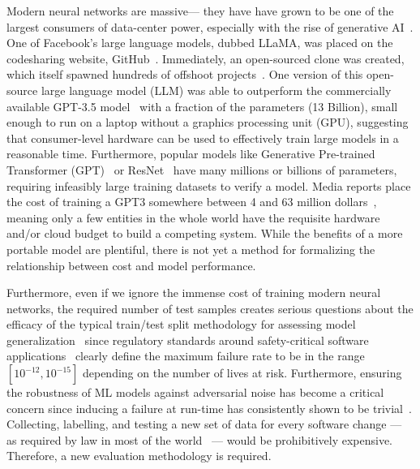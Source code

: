 \documentclass[conference]{IEEEtran}
\begin{document}
Modern neural networks are massive--- they have have grown to be one of the largest consumers of data-center power, especially with the rise of generative AI~\cite{msft_water}.
One of Facebook's large language models, dubbed LLaMA, was placed on the codesharing website, GitHub~\cite{llama}. Immediately, an open-sourced clone was created, which itself spawned hundreds of offshoot projects~\cite{openllama}. One version of this open-source large language model (LLM) was able to outperform the commercially available GPT-3.5 model~\cite{liu2023goat} with a fraction of the parameters (13 Billion), small enough to run on a laptop without a graphics processing unit (GPU), suggesting that consumer-level hardware can be used to effectively train large models in a reasonable time. Furthermore, popular models like Generative Pre-trained Transformer (GPT)~\cite{floridi2020gpt} or ResNet~\cite{resnet} have many millions or billions of parameters, requiring infeasibly large training datasets to verify a model\cite{vcdimension}. Media reports place the cost of training a GPT3 somewhere between 4 and 63 million dollars~\cite{Patel_Ahmad_2023,Feswing_2023}, meaning only a few entities in the whole world have the requisite hardware and/or cloud budget to build a competing system. While the benefits of a more portable model are plentiful, there is not yet a method for formalizing the relationship between cost and model performance.

Furthermore, even if we ignore the immense cost of training modern neural networks, the required number of test samples creates serious questions about the efficacy of the typical train/test split methodology for assessing model generalization~\cite{meyers} since regulatory standards around safety-critical software applications~\cite{IEC61508,iso26262,aviation_software,safetyframework} clearly define the maximum failure rate to be in the range $[10^{-12}, 10^{-15}]$ depending on the number of lives at risk. Furthermore, ensuring the robustness of ML models against adversarial noise has become a critical concern since inducing a failure at run-time has consistently shown to be trivial~\cite{adversarialpatch, carlini_towards_2017, croce_reliable_2020, hopskipjump, chakraborty2018adversarial, art2018}. Collecting, labelling, and testing a new set of data for every software change --- as required by law in most of the world~\cite{IEC61508,iso26262,aviation_software,safetyframework} --- would be prohibitively expensive. Therefore, a new evaluation methodology is required.
\end{document}
